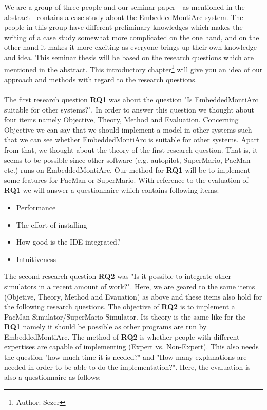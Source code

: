 We are a group of three people and our seminar paper - as mentioned in the abstract - contains a case study about the EmbeddedMontiArc system. The people in this group have different preliminary knowledges which makes the writing of a case study somewhat more complicated on the one hand, and on the other hand it makes it more exciting as everyone brings up their own knowledge and idea. This seminar thesis will be based on the research questions which are mentioned in the abstract. This introductory chapter\footnote{Author: Sezer} will give you an idea of our approach and methods with regard to the research questions.
\\ \\
The first research question \textbf{RQ1} was about the question "Is EmbeddedMontiArc suitable for other systems?". In order to answer this question we thought about four items namely Objective, Theory, Method and Evaluation. Concerning Objective we can say that we should implement a model in other systems such that we can see whether EmbeddedMontiArc is suitable for other systems. Apart from that, we thought about the theory of the first research question. That is, it seems to be possible since other software (e.g. autopilot, SuperMario, PacMan etc.) runs on EmbeddedMontiArc. Our method for \textbf{RQ1} will be to implement some features for PacMan or SuperMario. With reference to the evaluation of \textbf{RQ1} we will answer a questionnaire which contains following items:
\begin{itemize}
	\item Performance
	\item The effort of installing
	\item How good is the IDE integrated?
	\item Intuitiveness
\end{itemize}
The second research question \textbf{RQ2} was "Is it possible to integrate other simulators in a recent amount of work?". Here, we are geared to the same items (Objetive, Theory, Method and Evauation) as above and these items also hold for the following research questions. The objective of \textbf{RQ2} is to implement a PacMan Simulator/SuperMario Simulator. Its theory is the same like for the \textbf{RQ1} namely it should be possible as other programs are run by EmbeddedMontiArc. The method of \textbf{RQ2} is whether people with different expertises are capable of implementing (Expert vs. Non-Expert). This also needs the question "how much time it is needed?" and "How many explanations are needed in order to be able to do the implementation?". Here, the evaluation is also a questionnaire as follows:
